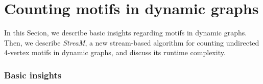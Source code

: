 \documentclass{article}
\begin{document}
\newcommand{\add}[1]{{\text add}(#1)}
\newcommand{\rem}[1]{{\text rm}(#1)}

\newcommand{\motifs}{{\cal M}}
\newcommand{\motif}[1]{m_{#1}}

\newcommand{\mcount}{{\cal F}}
\newcommand{\mcountof}[1]{{\cal F}(\motif{#1})}
\newcommand{\mcountofat}[2]{{\cal F}_{#2}(\motif{#1})}



\newcommand{\ra}{$\rightarrow$}


\newcommand{\eqn}[1]{
	\begin{equation*}
		#1
	\end{equation*}
}

\newcommand{\eqna}[1]{
	\begin{eqnarray*}
		#1
	\end{eqnarray*}
}


\newcommand{\operationAdd}[1]{+(#1)}
\newcommand{\operationChange}[2]{(#1 \rightarrow #2)}

\newcommand{\operationAddInv}[1]{-(#1)}
\newcommand{\operationChangeInv}[2]{(#1 \leftarrow #2)}

\newcommand{\operation}{{\cal O}}
\newcommand{\signature}{{\cal S}}
\newcommand{\signatureofabcd}{\signature(a,b,c,d)}






\section{Counting motifs in dynamic graphs}
\label{sec:algorithm}

In this Secion, we describe basic insights regarding motifs in dynamic graphs.
Then, we describe \emph{StreaM}, a new stream-based algorithm for counting undirected 4-vertex motifs in dynamic graphs, and discuss its runtime complexity.






\subsubsection{Basic insights}
\end{document}
